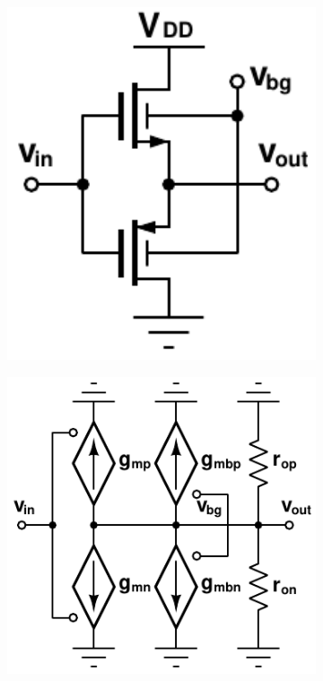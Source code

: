 			\begin{figure}[htb!]
			    \centering
			    \begin{subfigure}{0.25\textwidth}
			        \centering
			        \includegraphics[width=1\textwidth, angle=0]{./figs/design/fig_10a_}
			        \caption{ }
			        \label{fig:fig_10a}
			    \end{subfigure}%
			    \begin{subfigure}{0.33\textwidth}
			        \centering
			        \includegraphics[width=1\textwidth, angle=0]{./figs/design/fig_10b}

\end{subfigure}
\end{figure}
